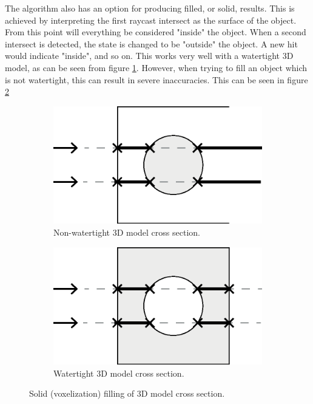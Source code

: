 The algorithm also has an option for producing filled, or solid, results. This is achieved by interpreting the first raycast intersect as the surface of the object. From this point will everything be considered "inside" the object. When a second intersect is detected, the state is changed to be "outside" the object. A new hit would indicate "inside", and so on. This works very well with a watertight 3D model, as can be seen from figure \ref{fig:filling-non-watertight-model}. However, when trying to fill an object which is not watertight, this can result in severe inaccuracies. This can be seen in figure \ref{fig:filling-watertight-model}

\begin{figure}[h]
    \centering
    \begin{subfigure}[b]{0.45\textwidth}
        \centering
        \includegraphics[width=\textwidth]{sections/methodology/figures/solid-non-watertight}
        \caption{Non-watertight 3D model cross section.}
        \label{fig:filling-non-watertight-model}
    \end{subfigure}
    \hfill
    \begin{subfigure}[b]{0.45\textwidth}
        \centering
        \includegraphics[width=\textwidth]{sections/methodology/figures/solid-watertight}
        \caption{Watertight 3D model cross section.}
        \label{fig:filling-watertight-model}
    \end{subfigure}
       \caption{Solid (voxelization) filling of 3D model cross section.}
       \label{fig:filling-3d-model}
\end{figure}

